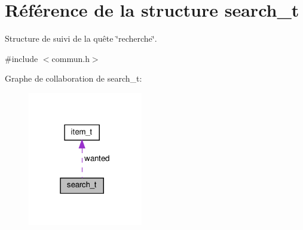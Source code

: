 \hypertarget{structsearch__t}{}\section{Référence de la structure search\+\_\+t}
\label{structsearch__t}


Structure de suivi de la quête \char`\"{}recherche\char`\"{}.  




{\ttfamily \#include $<$commun.\+h$>$}



Graphe de collaboration de search\+\_\+t\+:
\nopagebreak
\begin{figure}[H]
\begin{center}
\leavevmode
\includegraphics[width=142pt]{structsearch__t__coll__graph}
\end{center}
\end{figure}
